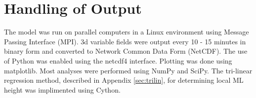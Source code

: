 \section{Handling of Output}

The model was run on parallel computers in a Linux environment using Message Passing Interface (MPI). 3d variable fields were output every 10 - 15 minutes in binary form and converted to Network Common Data Form (NetCDF).  The use of Python was enabled using the netcdf4 interface.  Plotting was done using matplotlib. Most analyses were performed using NumPy and SciPy.  The tri-linear regression method, described in Appendix \ref{sec:trilin}, for determining local \acs{ML} height was implimented using Cython.

\endinput

Any text after an \endinput is ignored.
You could put scraps here or things in progress.
